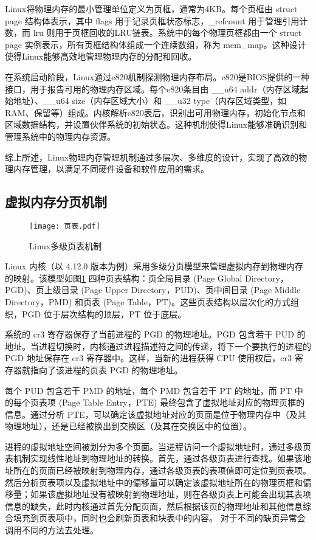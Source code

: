 Linux将物理内存的最小管理单位定义为页框，通常为4KB。每个页框由 struct page 结构体表示，其中 flags 用于记录页框状态标志，\_refcount 用于管理引用计数，而 lru 则用于页框回收的LRU链表。系统中的每个物理页框都由一个 struct page 实例表示，所有页框结构体组成一个连续数组，称为 mem\_map。这种设计使得Linux能够高效地管理物理内存的分配和回收。

在系统启动阶段，Linux通过e820机制探测物理内存布局。e820是BIOS提供的一种接口，用于报告可用的物理内存区域。每个e820条目由 \_\_u64 addr（内存区域起始地址）、\_\_u64 size（内存区域大小）和 \_\_u32 type（内存区域类型，如RAM、保留等）组成。内核解析e820表后，识别出可用物理内存，初始化节点和区域数据结构，并设置伙伴系统的初始状态。这种机制使得Linux能够准确识别和管理系统中的物理内存资源。

综上所述，Linux物理内存管理机制通过多层次、多维度的设计，实现了高效的物理内存管理，以满足不同硬件设备和软件应用的需求。

\subsection{虚拟内存分页机制}

\begin{figure}[h]
    \centering
    \texttt{[image: 页表.pdf]}
    \caption{Linux多级页表机制}
    \label{页表}
\end{figure}

Linux 内核（以 4.12.0 版本为例）采用多级分页模型来管理虚拟内存到物理内存的映射。该模型如图\ref{页表} 四种页表结构：页全局目录 (Page Global Directory，PGD)、页上级目录 (Page Upper Directory，PUD)、页中间目录 (Page Middle Directory，PMD) 和页表 (Page Table，PT)。这些页表结构以层次化的方式组织，PGD 位于层次结构的顶层，PT 位于底层。

系统的 cr3 寄存器保存了当前进程的 PGD 的物理地址。PGD 包含若干 PUD 的地址。当进程切换时，内核通过进程描述符之间的传递，将下一个要执行的进程的 PGD 地址保存在 cr3 寄存器中。这样，当新的进程获得 CPU 使用权后，cr3 寄存器就指向了该进程的页表 PGD 的物理地址。

每个 PUD 包含若干 PMD 的地址，每个 PMD 包含若干 PT 的地址，而 PT 中的每个页表项 (Page Table Entry，PTE) 最终包含了虚拟地址对应的物理页框的信息。通过分析 PTE，可以确定该虚拟地址对应的页面是位于物理内存中（及其物理地址），还是已经被换出到交换区（及其在交换区中的位置）。

进程的虚拟地址空间被划分为多个页面。当进程访问一个虚拟地址时，通过多级页表机制实现线性地址到物理地址的转换。首先，通过各级页表进行查找。如果该地址所在的页面已经被映射到物理内存，通过各级页表的表项值即可定位到页表项。然后分析页表项以及虚拟地址中的偏移量可以确定该虚拟地址所在的物理页框和偏移量；如果该虚拟地址没有被映射到物理地址，则在各级页表上可能会出现其表项信息的缺失，此时内核通过首先分配页面，然后根据该页的物理地址和其他信息综合填充到页表项中，同时也会刷新页表和块表中的内容。 对于不同的缺页异常会调用不同的方法去处理。


